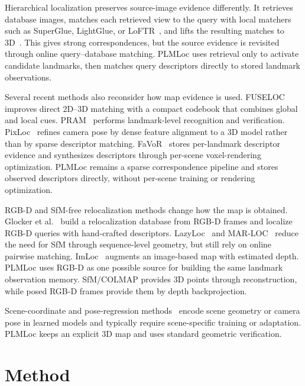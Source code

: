 \documentclass[letterpaper,10 pt,conference]{ieeeconf}
\newcommand{\method}{PLMLoc}
\begin{document}
Hierarchical localization preserves source-image evidence differently. It retrieves database images, matches each retrieved view to the query with local matchers such as SuperGlue, LightGlue, or LoFTR~\cite{sarlin2020superglue,lindenberger2023lightglue,sun2021loftr}, and lifts the resulting matches to 3D~\cite{sarlin2019hloc,arandjelovic2016netvlad,sattler2018benchmarking,vislocbenchmark}. This gives strong correspondences, but the source evidence is revisited through online query--database matching. \method{} uses retrieval only to activate candidate landmarks, then matches query descriptors directly to stored landmark observations.

Several recent methods also reconsider how map evidence is used. FUSELOC~\cite{nguyen2024fuseloc} improves direct 2D--3D matching with a compact codebook that combines global and local cues. PRAM~\cite{xue2024pram} performs landmark-level recognition and verification. PixLoc~\cite{sarlin2021pixloc} refines camera pose by dense feature alignment to a 3D model rather than by sparse descriptor matching. FaVoR~\cite{polizzi2025favor} stores per-landmark descriptor evidence and synthesizes descriptors through per-scene voxel-rendering optimization. \method{} remains a sparse correspondence pipeline and stores observed descriptors directly, without per-scene training or rendering optimization.

RGB-D and SfM-free relocalization methods change how the map is obtained. Glocker et al.~\cite{glocker2013relocalization} build a relocalization database from RGB-D frames and localize RGB-D queries with hand-crafted descriptors. LazyLoc~\cite{dong2023lazyloc} and MAR-LOC~\cite{gassol2024marloc} reduce the need for SfM through sequence-level geometry, but still rely on online pairwise matching. ImLoc~\cite{jiang2026imloc} augments an image-based map with estimated depth. \method{} uses RGB-D as one possible source for building the same landmark observation memory. SfM/COLMAP provides 3D points through reconstruction, while posed RGB-D frames provide them by depth backprojection.

Scene-coordinate and pose-regression methods~\cite{shotton2013scene,brachmann2017dsac,brachmann2023ace,kendall2015posenet} encode scene geometry or camera pose in learned models and typically require scene-specific training or adaptation. \method{} keeps an explicit 3D map and uses standard geometric verification.


\section{Method}
\end{document}
